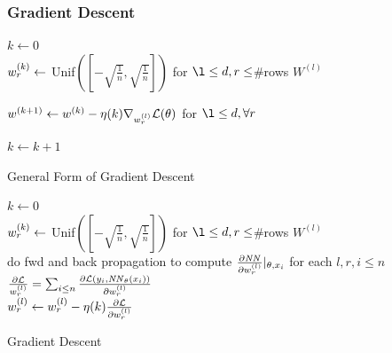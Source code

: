 \subsubsection{Gradient Descent}
\begin{algorithm}[H]  
	$k\gets 0$ \\
	$w^{(k)}_r \gets$ Unif$([-\sqrt{\frac{1}{n}}, \sqrt{\frac{1}{n}}])$ for $\l \leq d, r\leq$\#rows $W^{(l)}$ \\
   {
      $w^{(k+1)} \gets w^{(k)} - \eta(k)\nabla_{w^{(l)}_r} \mathcal L(\theta)$ for $\l \leq d, \forall r $
      
      $k\gets k+1$ 
  	}
  \caption{General Form of Gradient Descent}
\end{algorithm}


\begin{algorithm}[H]  
	$k\gets 0$ \\
	$w^{(k)}_r \gets$ Unif$([-\sqrt{\frac{1}{n}}, \sqrt{\frac{1}{n}}])$ for $\l \leq d, r\leq$\#rows $W^{(l)}$ \\
   {
      do fwd and back propagation to compute $\frac{\partial \mathit{NN}}{\partial w^{(l)}_r} \vert_{\theta, x_i} $ for each $l,r,i\leq n$ \\
      $\frac{\partial\mathcal L}{w^{(l)}_r} =\sum_{i\leq n} \frac{\partial \mathcal L(y_i, \mathit{NN}_\theta(x_i))}{\partial w^{(l)}_r}$ \\
      $w^{(l)}_r \gets w^{(l)}_r - \eta(k) \frac{\partial \mathcal L}{\partial w^{(l)}_r}$
  	}
  \caption{Gradient Descent}
\end{algorithm}

